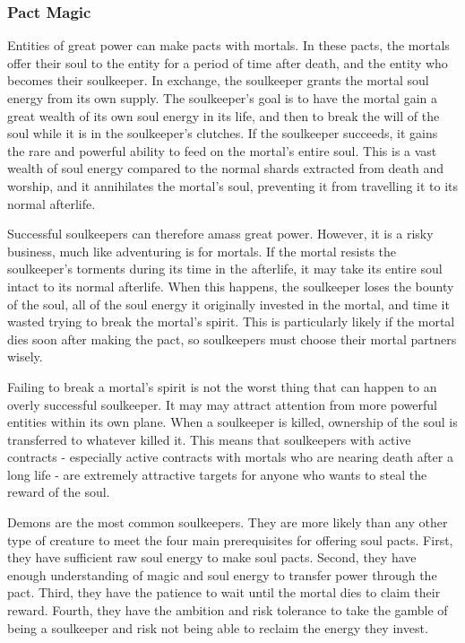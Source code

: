         \subsubsection{Pact Magic}
            Entities of great power can make pacts with mortals.
            In these pacts, the mortals offer their soul to the entity for a period of time after death, and the entity who becomes their soulkeeper.
            In exchange, the soulkeeper grants the mortal soul energy from its own supply.
            The soulkeeper's goal is to have the mortal gain a great wealth of its own soul energy in its life, and then to break the will of the soul while it is in the soulkeeper's clutches.
            If the soulkeeper succeeds, it gains the rare and powerful ability to feed on the mortal's entire soul.
            This is a vast wealth of soul energy compared to the normal shards extracted from death and worship, and it annihilates the mortal's soul, preventing it from travelling it to its normal afterlife.

            Successful soulkeepers can therefore amass great power.
            However, it is a risky business, much like adventuring is for mortals.
            If the mortal resists the soulkeeper's torments during its time in the afterlife, it may take its entire soul intact to its normal afterlife.
            When this happens, the soulkeeper loses the bounty of the soul, all of the soul energy it originally invested in the mortal, and time it wasted trying to break the mortal's spirit.
            This is particularly likely if the mortal dies soon after making the pact, so soulkeepers must choose their mortal partners wisely.

            Failing to break a mortal's spirit is not the worst thing that can happen to an overly successful soulkeeper.
            It may may attract attention from more powerful entities within its own plane.
            When a soulkeeper is killed, ownership of the soul is transferred to whatever killed it.
            This means that soulkeepers with active contracts - especially active contracts with mortals who are nearing death after a long life - are extremely attractive targets for anyone who wants to steal the reward of the soul.

            Demons are the most common soulkeepers.
            They are more likely than any other type of creature to meet the four main prerequisites for offering soul pacts.
            First, they have sufficient raw soul energy to make soul pacts.
            Second, they have enough understanding of magic and soul energy to transfer power through the pact.
            Third, they have the patience to wait until the mortal dies to claim their reward.
            Fourth, they have the ambition and risk tolerance to take the gamble of being a soulkeeper and risk not being able to reclaim the energy they invest.

